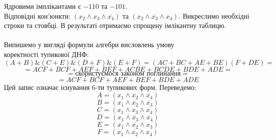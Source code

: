 \documentclass[14pt,a4paper]{scrartcl}
\theoremstyle{definition}
\theoremstyle{remark}
\theoremstyle{definition}
\theoremstyle{definition}
\begin{document}
Ядровими імплікантами є $-110$ та $-101$.\\ Відповідні кон'юнкти:
$(x_2 \wedge x_3 \wedge \overline{x_4})$
та
$(x_2 \wedge \overline{x_3} \wedge x_4)$.
Викреслимо необхідні строки та стовбці. В результаті отримаємо спрощену імлікантну таблицю.\\
\pagebreak
\\
Випишемо у вигляді формули алгебри висловлень умову \\коректності тупикової ДНФ: $$
(A+B)\&(C+E)\&(D+F)\&(E+F) = (AC + BC + AE + BE)(F + DE) =$$ $$= ACF + BCF + AEF + BEF + ACBE + BCDE + BDE + ADE = $$ $$ = \textbf{скористуємося законом поглинання} =$$ $$ =
ACF + BCF + AEF + BEF + BDE + ADE
$$
Цей запис означає існування 6-ти тупикових форм. Переведемо:\\
$$A = (x_1 \wedge x_2 \wedge \overline{x_4})$$
$$B = (x_1 \wedge x_2 \wedge \overline{x_3})$$
$$C = (x_1 \wedge x_3 \wedge \overline{x_4})$$
$$D = (x_1 \wedge \overline{x_3} \wedge x_4)$$
$$E = (x_1 \wedge \overline{x_2} \wedge x_3)$$
$$F = (x_1 \wedge \overline{x_2} \wedge x_4)$$
\end{document}
